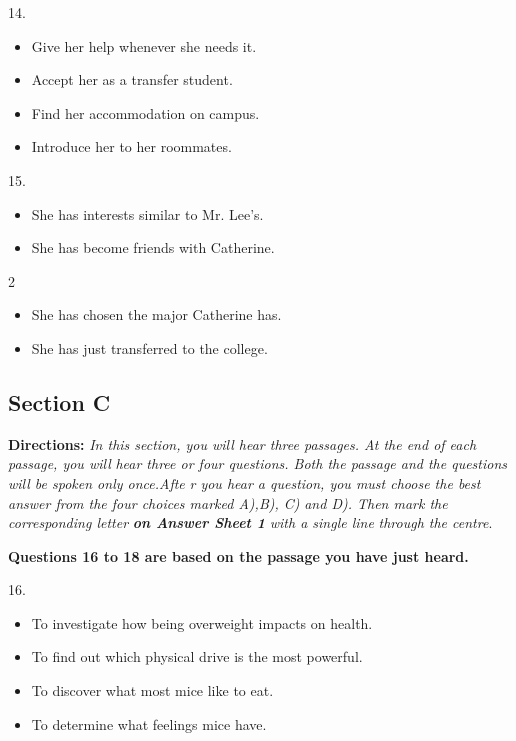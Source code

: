 \documentclass[UTF8,11pt]{ctexart}
\begin{document}
14.


\begin{itemize}[leftmargin=2em,itemsep=.2em,topsep=.4em]\item[A.] Give her help whenever she needs it.
\item[B.] Accept her as a transfer student.
\item[C.] Find her accommodation on campus.
\item[D.] Introduce her to her roommates.
\end{itemize}

15.


\begin{itemize}[leftmargin=2em,itemsep=.2em,topsep=.4em]\item[A.] She has interests similar to Mr. Lee's.
\item[B.] She has become friends with Catherine.
\end{itemize}

2


\begin{itemize}[leftmargin=2em,itemsep=.2em,topsep=.4em]\item[C.] She has chosen the major Catherine has.
\item[D.] She has just transferred to the college.
\end{itemize}

\subsection*{\textbf{Section C}}


\textbf{Directions:}\textit{ In this section, you will hear three passages. At the end of each passage, you will} \textit{hear three or four questions. Both the passage and the questions will be spoken only once.Afte} \textit{r you hear a question, you must choose the best answer from the four choices marked A),B), C)} \textit{and D). Then mark the corresponding letter}\textbf{\textit{ on Answer Sheet 1}}\textit{ with a single line} \textit{through the centre}.


\textbf{Questions 16 to 18 are based on the passage you have just heard.}


16.


\begin{itemize}[leftmargin=2em,itemsep=.2em,topsep=.4em]\item[A.] To investigate how being overweight impacts on health.
\item[B.] To find out which physical drive is the most powerful.
\item[C.] To discover what most mice like to eat.
\item[D.] To determine what feelings mice have.
\end{itemize}
\end{document}
